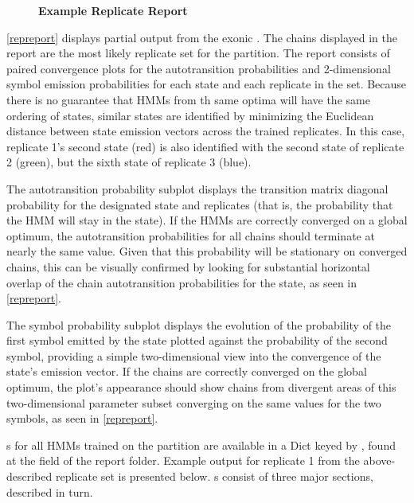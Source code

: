 \begin{figure}[!h]
    \caption{{\bf Example \protect{} Replicate Report}}
    \label{repreport}
\end{figure}

\autoref{repreport} displays partial output from the exonic . The chains displayed in the report are the most likely replicate set for the partition. The report consists of paired convergence plots for the autotransition probabilities and 2-dimensional symbol emission probabilities for each state and each replicate in the set. Because there is no guarantee that HMMs from th same optima will have the same ordering of states, similar states are identified by minimizing the Euclidean distance between state emission vectors across the trained replicates. In this case, replicate 1's second state (red) is also identified with the second state of replicate 2 (green), but the sixth state of replicate 3 (blue).

The autotransition probability subplot displays the transition matrix diagonal probability for the designated state and replicates (that is, the probability that the HMM will stay in the state). If the HMMs are correctly converged on a global optimum, the autotransition probabilities for all chains should terminate at nearly the same value. Given that this probability will be stationary on converged chains, this can be visually confirmed by looking for substantial horizontal overlap of the chain autotransition probabilities for the state, as seen in \autoref{repreport}.

The symbol probability subplot displays the evolution of the probability of the first symbol emitted by the state plotted against the probability of the second symbol, providing a simple two-dimensional view into the convergence of the state's emission vector. If the chains are correctly converged on the global optimum, the plot's appearance should show chains from divergent areas of this two-dimensional parameter subset converging on the same values for the two symbols, as seen in \autoref{repreport}.

s for all HMMs trained on the partition are available in a Dict keyed by , found at the  field of the report folder. Example output for replicate 1 from the above-described replicate set is presented below. s consist of three major sections, described in turn.

